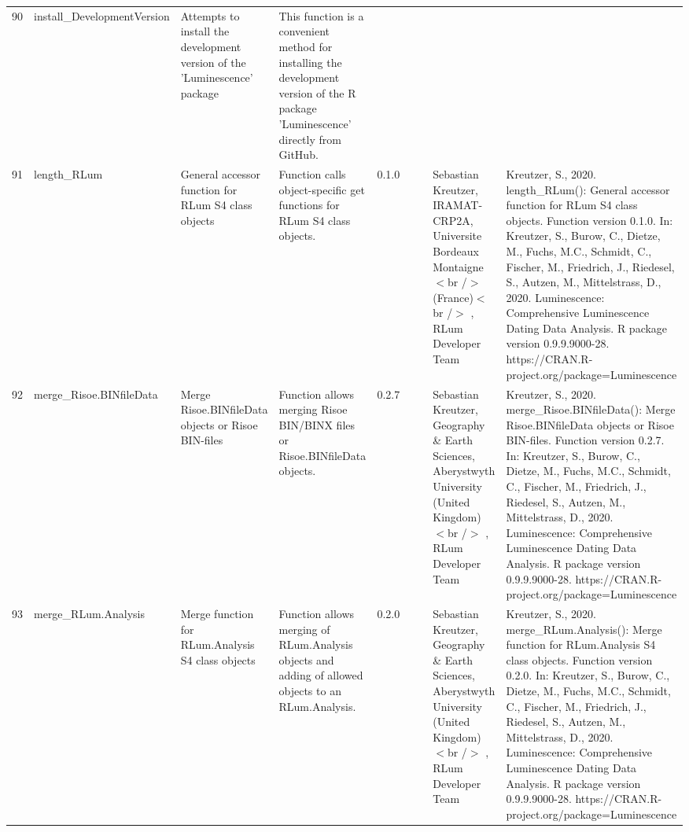\begin{table}[ht]
\begin{tabular}{rllllllll}
 \\ 
  90 & install\_DevelopmentVersion & Attempts to install the development version of the 'Luminescence' package & This function is a convenient method for installing the development version of the R package 'Luminescence' directly from GitHub. &  &  &  &  &  \\ 
  91 & length\_RLum & General accessor function for RLum S4 class objects & Function calls object-specific get functions for RLum S4 class objects. & 0.1.0
 &  &  & Sebastian Kreutzer, IRAMAT-CRP2A, Universite Bordeaux Montaigne$<$br /$>$ (France)$<$br /$>$ , RLum Developer Team & Kreutzer, S., 2020. length\_RLum(): General accessor function for RLum S4 class objects. Function version 0.1.0. In: Kreutzer, S., Burow, C., Dietze, M., Fuchs, M.C., Schmidt, C., Fischer, M., Friedrich, J., Riedesel, S., Autzen, M., Mittelstrass, D., 2020. Luminescence: Comprehensive Luminescence Dating Data Analysis. R package version 0.9.9.9000-28. https://CRAN.R-project.org/package=Luminescence
 \\ 
  92 & merge\_Risoe.BINfileData & Merge Risoe.BINfileData objects or Risoe BIN-files & Function allows merging Risoe BIN/BINX files or Risoe.BINfileData objects. & 0.2.7
 &  &  & Sebastian Kreutzer, Geography \& Earth Sciences, Aberystwyth University (United Kingdom)$<$br /$>$ , RLum Developer Team & Kreutzer, S., 2020. merge\_Risoe.BINfileData(): Merge Risoe.BINfileData objects or Risoe BIN-files. Function version 0.2.7. In: Kreutzer, S., Burow, C., Dietze, M., Fuchs, M.C., Schmidt, C., Fischer, M., Friedrich, J., Riedesel, S., Autzen, M., Mittelstrass, D., 2020. Luminescence: Comprehensive Luminescence Dating Data Analysis. R package version 0.9.9.9000-28. https://CRAN.R-project.org/package=Luminescence
 \\ 
  93 & merge\_RLum.Analysis & Merge function for RLum.Analysis S4 class objects & Function allows merging of RLum.Analysis objects and adding of allowed objects to an RLum.Analysis. & 0.2.0
 &  &  & Sebastian Kreutzer, Geography \& Earth Sciences, Aberystwyth University (United Kingdom)$<$br /$>$ , RLum Developer Team & Kreutzer, S., 2020. merge\_RLum.Analysis(): Merge function for RLum.Analysis S4 class objects. Function version 0.2.0. In: Kreutzer, S., Burow, C., Dietze, M., Fuchs, M.C., Schmidt, C., Fischer, M., Friedrich, J., Riedesel, S., Autzen, M., Mittelstrass, D., 2020. Luminescence: Comprehensive Luminescence Dating Data Analysis. R package version 0.9.9.9000-28. https://CRAN.R-project.org/package=Luminescence
 \\ 

\end{tabular}
\end{table}
